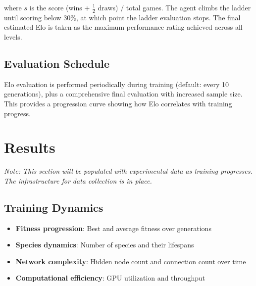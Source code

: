 \documentclass[11pt, twocolumn]{article}
\begin{document}
where $s$ is the score (wins $+$ $\frac{1}{2}$ draws) / total games. The agent climbs the ladder until scoring below 30\%, at which point the ladder evaluation stops. The final estimated Elo is taken as the maximum performance rating achieved across all levels.

\subsection{Evaluation Schedule}
Elo evaluation is performed periodically during training (default: every 10 generations), plus a comprehensive final evaluation with increased sample size. This provides a progression curve showing how Elo correlates with training progress.

\section{Results}
\label{sec:results}

\textit{Note: This section will be populated with experimental data as training progresses. The infrastructure for data collection is in place.}

\subsection{Training Dynamics}

\begin{itemize}[leftmargin=*, itemsep=2pt]
    \item \textbf{Fitness progression}: Best and average fitness over generations
    \item \textbf{Species dynamics}: Number of species and their lifespans
    \item \textbf{Network complexity}: Hidden node count and connection count over time
    \item \textbf{Computational efficiency}: GPU utilization and throughput
\end{itemize}
\end{document}
